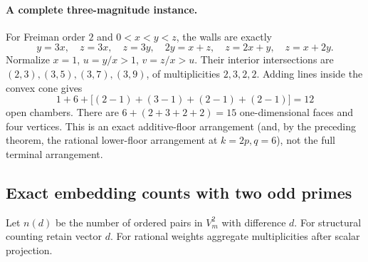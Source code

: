 \paragraph{A complete three-magnitude instance.}
For Freiman order $2$ and $0<x<y<z$, the walls are exactly
\[
y=3x,\quad z=3x,\quad z=3y,\quad 2y=x+z,\quad
z=2x+y,\quad z=x+2y.
\]
Normalize $x=1$, $u=y/x>1$, $v=z/x>u$. Their interior intersections are
$(2,3),(3,5),(3,7),(3,9)$, of multiplicities $2,3,2,2$. Adding lines inside the convex cone gives
\[
1+6+\bigl[(2-1)+(3-1)+(2-1)+(2-1)\bigr]=12
\]
open chambers. There are $6+(2+3+2+2)=15$ one-dimensional faces and four vertices. This is an exact additive-floor arrangement (and, by the preceding theorem, the rational lower-floor arrangement at $k=2p,q=6$), not the full terminal arrangement.

\subsection{Exact embedding counts with two odd primes}\label{ext:sec:counts}
Let $n(d)$ be the number of ordered pairs in $V_m^2$ with difference $d$. For structural counting retain vector $d$. For rational weights aggregate multiplicities after scalar projection.

